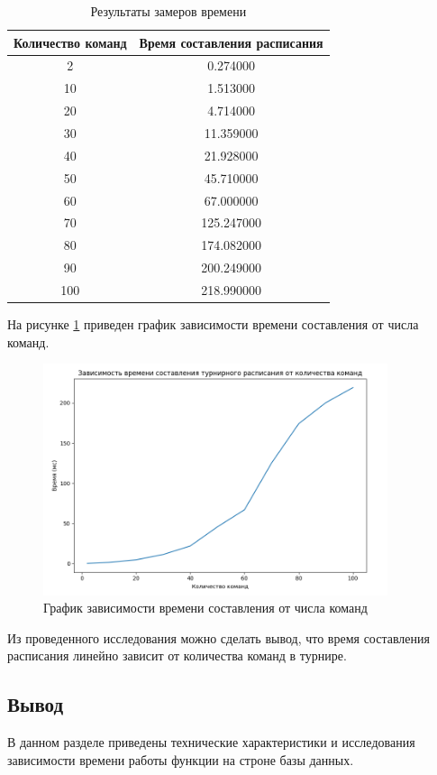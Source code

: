 \begin{table}[H]
	\begin{center}
		\caption{Результаты замеров времени}
		\begin{tabular}{|c|c|}
			\hline
			Количество команд & Время составления расписания \\
			\hline
			2 & 0.274000 \\
			\hline
			10 & 1.513000 \\
			\hline			
			20 & 4.714000 \\
			\hline			
			30 & 11.359000 \\
			\hline			
			40 & 21.928000 \\
			\hline			
			50 & 45.710000 \\
			\hline			
			60 & 67.000000 \\
			\hline			
			70 & 125.247000 \\
			\hline			
			80 & 174.082000 \\
			\hline			
			90 & 200.249000 \\
			\hline			
			100 & 218.990000 \\
			\hline			
		\end{tabular}
		\label{table:time}
	\end{center}
\end{table}

На рисунке \ref{fig:research} приведен график зависимости времени составления от числа команд.
\begin{figure}[h]
	\centering
	\includegraphics[width=0.9\textwidth]{img/research.png}
	\caption{График зависимости времени составления от числа команд}
	\label{fig:research}
\end{figure}

Из проведенного исследования можно сделать вывод, что время составления расписания линейно зависит от количества команд в турнире.

\subsection*{Вывод}
В данном разделе приведены технические характеристики и исследования зависимости времени работы функции на строне базы данных.